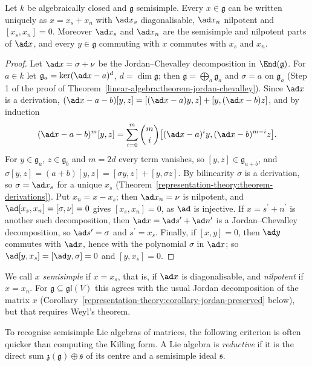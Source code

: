 \begin{proposition}\label{representation-theory:proposition-abstract-jordan}
Let $k$ be algebraically closed and $\mathfrak{g}$ semisimple. Every $x \in \mathfrak{g}$ can be written uniquely as $x = x_s + x_n$ with $\ad x_s$ diagonalisable, $\ad x_n$
nilpotent and $[x_s, x_n] = 0$. Moreover $\ad x_s$ and $\ad x_n$ are the semisimple and nilpotent parts of $\ad x$, and every $y \in \mathfrak{g}$ commuting with $x$ commutes with
$x_s$ and $x_n$.
\end{proposition}

\begin{proof}
Let $\ad x = \sigma + \nu$ be the Jordan--Chevalley decomposition in $\End(\mathfrak{g})$. For $a \in k$ let $\mathfrak{g}_a = \ker(\ad x - a)^d$, $d = \dim\mathfrak{g}$; then
$\mathfrak{g} = \bigoplus_a\mathfrak{g}_a$ and $\sigma = a$ on $\mathfrak{g}_a$ (Step 1 of the proof of Theorem~\ref{linear-algebra:theorem-jordan-chevalley}). Since $\ad x$ is a
derivation, $(\ad x - a - b)[y, z] = [(\ad x - a)y, z] + [y, (\ad x - b)z]$, and by induction
\[
(\ad x - a - b)^m[y, z] = \sum_{i=0}^m\binom{m}{i}\bigl[(\ad x - a)^iy, (\ad x - b)^{m-i}z\bigr].
\]
For $y \in \mathfrak{g}_a$, $z \in \mathfrak{g}_b$ and $m = 2d$ every term vanishes, so $[y, z] \in \mathfrak{g}_{a+b}$, and
$\sigma[y, z] = (a + b)[y, z] = [\sigma y, z] + [y, \sigma z]$. By bilinearity $\sigma$ is a derivation, so $\sigma = \ad x_s$ for a unique $x_s$
(Theorem~\ref{representation-theory:theorem-derivations}). Put $x_n = x - x_s$; then $\ad x_n = \nu$ is nilpotent, and $\ad[x_s, x_n] = [\sigma, \nu] = 0$ gives
$[x_s, x_n] = 0$, as $\ad$ is injective. If $x = s^{\prime} + n^{\prime}$ is another such decomposition, then $\ad x = \ad s^{\prime} + \ad n^{\prime}$ is a Jordan--Chevalley
decomposition, so $\ad s^{\prime} = \sigma$ and $s^{\prime} = x_s$. Finally, if $[x, y] = 0$, then $\ad y$ commutes with $\ad x$, hence with the polynomial $\sigma$ in $\ad x$;
so $\ad[y, x_s] = [\ad y, \sigma] = 0$ and $[y, x_s] = 0$.
\end{proof}

We call $x$ \emph{semisimple} if $x = x_s$, that is, if $\ad x$ is diagonalisable, and \emph{nilpotent} if $x = x_n$. For $\mathfrak{g} \subseteq \mathfrak{gl}(V)$ this agrees
with the usual Jordan decomposition of the matrix $x$ (Corollary~\ref{representation-theory:corollary-jordan-preserved} below), but that requires Weyl's theorem.

To recognise semisimple Lie algebras of matrices, the following criterion is often quicker than computing the Killing form. A Lie algebra is \emph{reductive} if it is the direct sum
$\mathfrak{z}(\mathfrak{g}) \oplus \mathfrak{s}$ of its centre and a semisimple ideal $\mathfrak{s}$.

